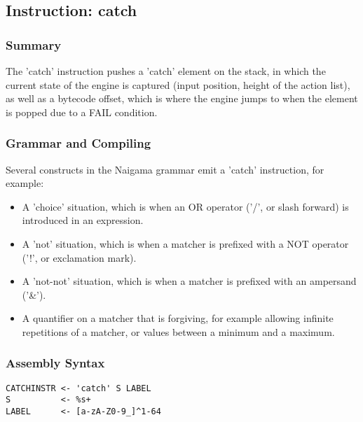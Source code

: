 \subsection{Instruction: catch}

\subsubsection{Summary}

The 'catch' instruction pushes a 'catch' element on the stack,
in which the current state of the engine is captured (input position,
height of the action list), as well as a bytecode offset, which
is where the engine jumps to when the element is popped due to a FAIL
condition.

\subsubsection{Grammar and Compiling}

Several constructs in the Naigama grammar emit a 'catch' instruction,
for example:

\begin{itemize}

\item A 'choice' situation, which is when an OR operator ('/', or
slash forward) is introduced in an expression.

\item A 'not' situation, which is when a matcher is prefixed with a NOT
operator ('!', or exclamation mark).

\item A 'not-not' situation, which is when a matcher is prefixed with an
ampersand ('\&').

\item A quantifier on a matcher that is forgiving, for example allowing
infinite repetitions of a matcher, or values between a minimum and a
maximum.

\end{itemize}

\subsubsection{Assembly Syntax}

\begin{myquote}
\begin{verbatim}
CATCHINSTR <- 'catch' S LABEL
S          <- %s+
LABEL      <- [a-zA-Z0-9_]^1-64

\end{verbatim}
\end{myquote}

